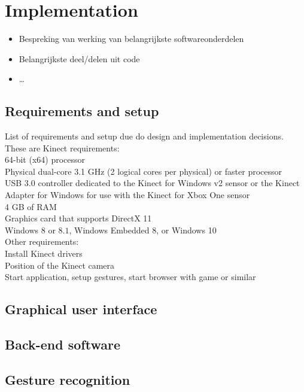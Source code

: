 \chapter{Implementation}

\begin{itemize}
\item Bespreking van werking van belangrijkste softwareonderdelen
\item Belangrijkste deel/delen uit code
\item \ldots
\end{itemize}


\section{Requirements and setup}

List of requirements and setup due do design and implementation decisions.\\

These are Kinect requirements:\\

64-bit (x64) processor\\
Physical dual-core 3.1 GHz (2 logical cores per physical) or faster processor\\
USB $3.0$ controller dedicated to the Kinect for Windows v2 sensor or the Kinect Adapter for Windows for use with the Kinect for Xbox One sensor\\
4 GB of RAM\\
Graphics card that supports DirectX 11\\
Windows 8 or $8.1$, Windows Embedded 8, or Windows 10\\


Other requirements:\\

Install Kinect drivers\\
Position of the Kinect camera\\
Start application, setup gestures, start browser with game or similar


\section{Graphical user interface}

\section{Back-end software}

\section{Gesture recognition}